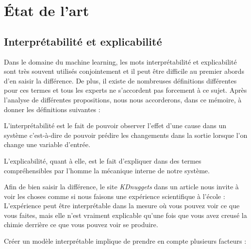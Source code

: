 \chapter{État de l’art}
\section{Interprétabilité et explicabilité}

Dans le domaine du machine learning, les mots interprétabilité et explicabilité sont très souvent utilisés conjointement et il peut être difficile au premier abords d'en saisir la différence. De plus, il existe de nombreuses définitions différentes pour ces termes et tous les experts ne s'accordent pas forcement à ce sujet. Après l'analyse de différentes propositions, nous nous accorderons, dans ce mémoire, à donner les définitions suivantes :\par
L'interprétabilité est le fait de pouvoir observer l'effet d'une cause dans un système c'est-à-dire de pouvoir prédire les changements dans la sortie lorsque l'on change une variable d'entrée.\par
L'explicabilité, quant à elle, est le fait d'expliquer dans des termes compréhensibles par l'homme la mécanique interne de notre système.\par
Afin de bien saisir la différence, le site \textit{KDnuggets} dans un article\cite{kdInterpre} nous invite à voir les choses comme si nous faisons une expérience scientifique à l'école : L'expérience peut être interprétable dans la mesure où vous pouvez voir ce que vous faites, mais elle n'est vraiment explicable qu'une fois que vous avez creusé la chimie derrière ce que vous pouvez voir se produire.\par
Créer un modèle interprétable implique de prendre en compte plusieurs facteurs :\par
